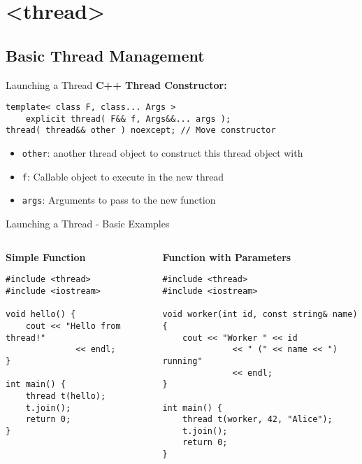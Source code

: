 \section{<thread>}

\subsection{Basic Thread Management}

\begin{frame}[fragile]{Launching a Thread}
	\textbf{C++ Thread Constructor:}
	\begin{verbatim}
template< class F, class... Args >
    explicit thread( F&& f, Args&&... args );
thread( thread&& other ) noexcept; // Move constructor
    \end{verbatim}
	\begin{itemize}
		\item \texttt{other}: another thread object to construct this thread object with
		\item \texttt{f}: Callable object to execute in the new thread
		\item \texttt{args}: Arguments to pass to the new function
	\end{itemize}
\end{frame}

\begin{frame}[fragile]{Launching a Thread - Basic Examples}
	\begin{columns}
		\begin{column}{0.5\textwidth}
			\textbf{Simple Function}
			\begin{verbatim}
#include <thread>
#include <iostream>

void hello() {
    cout << "Hello from thread!"
              << endl;
}

int main() {
    thread t(hello);
    t.join();
    return 0;
}
			\end{verbatim}
		\end{column}
		\begin{column}{0.5\textwidth}
			\textbf{Function with Parameters}
			\begin{verbatim}
#include <thread>
#include <iostream>

void worker(int id, const string& name) {
    cout << "Worker " << id
              << " (" << name << ") running"
              << endl;
}

int main() {
    thread t(worker, 42, "Alice");
    t.join();
    return 0;
}
			\end{verbatim}
		\end{column}
	\end{columns}
\end{frame}

